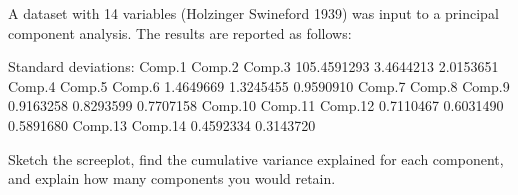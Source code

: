 \begin{exerciseboxpaper}
A dataset with 14 variables (Holzinger Swineford 1939) was input to a principal component analysis. The results are reported as follows:

\small
\begin{textcode}
Standard deviations:
     Comp.1      Comp.2      Comp.3 
105.4591293   3.4644213   2.0153651 
     Comp.4      Comp.5      Comp.6
  1.4649669   1.3245455   0.9590910 
     Comp.7      Comp.8      Comp.9 
  0.9163258   0.8293599   0.7707158
    Comp.10     Comp.11     Comp.12 
  0.7110467   0.6031490   0.5891680 
    Comp.13     Comp.14 
  0.4592334   0.3143720 
\end{textcode}
\normalsize

Sketch the screeplot, find the cumulative variance explained for each component, and explain how many components you would retain.
\end{exerciseboxpaper}


